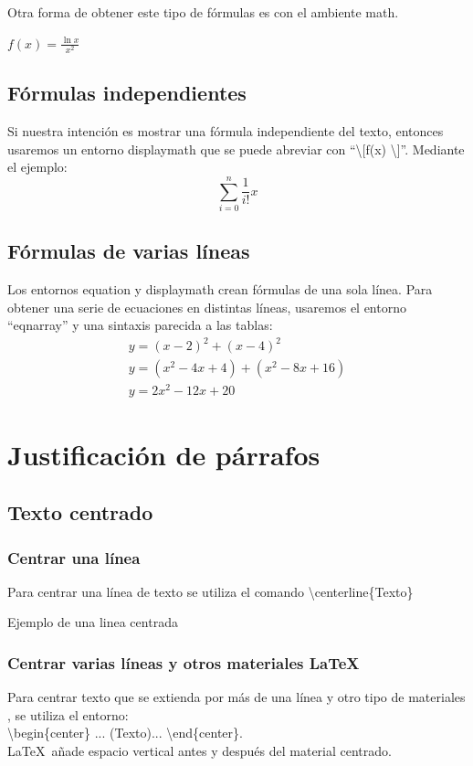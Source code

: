 \documentclass{article}
\begin{document}
Otra forma de obtener este tipo de f\'ormulas es con el ambiente math.

\begin{center}
\begin{math}
f(x)=\frac{\ln x}{x^2}
\end{math}
\end{center}

\subsection{F\'ormulas independientes}
Si nuestra intenci\'on es mostrar una f\'ormula independiente del texto,
entonces usaremos un entorno displaymath que se puede abreviar con
``\textbackslash [f(x) \textbackslash]''. Mediante el ejemplo:
\begin{displaymath}
\sum_{i=0}^{n}\frac{1}{i!}x 
\end{displaymath}

\subsection{F\'ormulas de varias l\'ineas}
Los entornos equation y displaymath crean f\'ormulas de una sola l\'inea. Para obtener una serie de ecuaciones en distintas l\'ineas, usaremos el 
entorno ``eqnarray'' y una sintaxis parecida a las tablas: 
\begin{eqnarray} 
y = (x-2)^2+(x-4)^2 
\nonumber \\ 
y = (x^2-4x+4)+(x^2-8x+16) \\ 
y = 2x^2-12x+20 
\end{eqnarray}


\section{Justificaci\'on de p\'arrafos} 
\subsection{Texto centrado} 

\subsubsection{Centrar una l\'inea} 
Para centrar una l\'inea de texto se utiliza el comando \textbackslash centerline\{Texto\}\\ \centerline{Ejemplo de una linea centrada} 

\subsubsection{Centrar varias l\'ineas y otros materiales \LaTeX} 
Para centrar texto que se extienda por m\'as de una l\'inea y otro tipo de materiales , se
utiliza el entorno:\\ 
\textbackslash begin\{center\} ... (Texto)... \textbackslash end\{center\}.\\
\LaTeX\ a\~nade espacio vertical antes y despu\'es del material centrado. 
\end{document}
